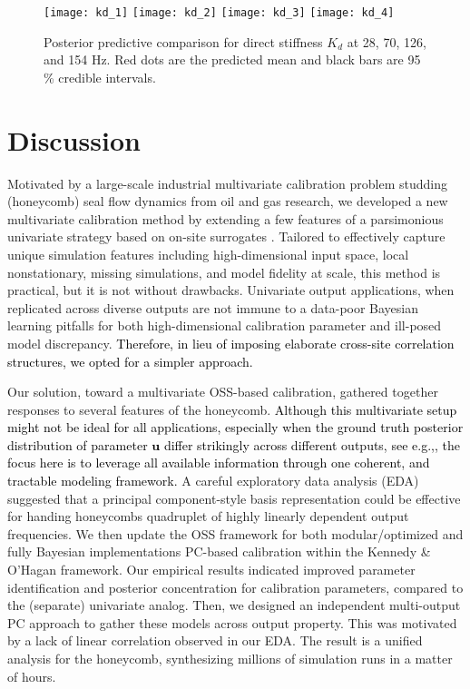 \documentclass[12pt]{article}
\newcommand{\blu}[1]{\textcolor{black}{#1}} %
\begin{document}
\begin{figure}[ht!]
\centering
\texttt{[image: kd\_1]}
\texttt{[image: kd\_2]}
\texttt{[image: kd\_3]}
\texttt{[image: kd\_4]}
\caption{Posterior predictive comparison for direct stiffness $K_d$ at 28, 70, 
126, and 154 Hz.  
Red dots are the predicted mean and black bars are 95 \% 
 credible intervals.}
\label{fig:pred_ori}
\end{figure}


\section{Discussion}
\label{sec:discuss}

Motivated by a large-scale industrial multivariate calibration problem
studding (honeycomb) seal flow dynamics from oil and gas research, we
developed a new multivariate calibration method by extending a few features of
a parsimonious univariate strategy based on on-site surrogates
\citep[OSSs;][]{Huang:2018}. Tailored to effectively capture unique simulation
features including high-dimensional input space, local nonstationary, missing
simulations, and model fidelity at scale, this method is practical, but it is
not without drawbacks. Univariate output applications, when replicated across
diverse outputs are not immune to a data-poor Bayesian learning pitfalls for
both high-dimensional calibration parameter and ill-posed model discrepancy.
\blu{Therefore, in lieu of imposing elaborate cross-site correlation structures, 
we opted for a simpler approach.}

Our solution, toward a multivariate OSS-based calibration, gathered together
responses to several features of the honeycomb. 
\blu{Although this multivariate  setup might not be ideal for all applications, especially
when the ground truth posterior distribution of parameter $\mathbf{u}$ differ
strikingly across different outputs, see e.g.,\cite{box},  the focus here is
to leverage all available information through one coherent, and tractable
modeling framework.} A careful exploratory data analysis (EDA) suggested that
a principal component-style basis representation could be effective for
handing honeycombs quadruplet of highly linearly dependent output frequencies.
We then update the OSS framework for both modular/optimized and fully Bayesian
implementations PC-based calibration within the Kennedy \& O'Hagan framework.
Our empirical results indicated improved parameter identification and
posterior concentration for calibration parameters, compared to the (separate)
univariate analog. Then, we designed an independent multi-output PC approach
to gather these models across output property.  This was motivated by a lack
of linear correlation observed in our EDA.  The result is a unified analysis
for the honeycomb, synthesizing millions of simulation runs in a matter of
hours.
\end{document}
